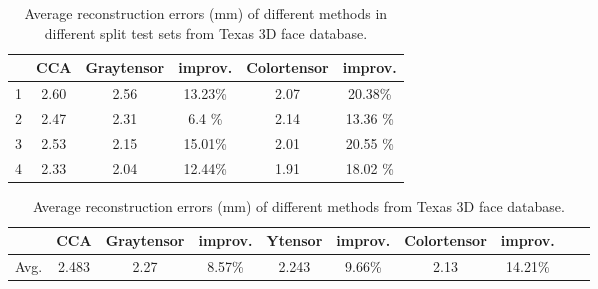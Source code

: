 \begin{table}[htbp]
\centering
\vfill 
\caption{Average reconstruction errors (mm) of different methods in different split test sets from Texas 3D face database.}
\label{table:Re4}%
\begin{tabular}[b]{|l||c|c|c|c|c|}
\hline
 &  CCA & Graytensor & improv. & Colortensor & improv.\\
\hline
\hline
 1  & 2.60 & 2.56 & 13.23\% & 2.07 & 20.38\%  \\   
\hline
 2   & 2.47 & 2.31 &6.4 \% & 2.14 & 13.36 \%  \\
\hline
 3   & 2.53 & 2.15 & 15.01\% & 2.01 & 20.55 \% \\
\hline
 4  & 2.33 & 2.04 & 12.44\% & 1.91 & 18.02 \%   \\
\hline
\end{tabular}%
\end{table}%

\begin{table}[htbp]
\centering
\vfill 
\caption{Average reconstruction errors (mm) of different methods from Texas 3D face database.}
\label{table:Re4_2}%
\begin{tabular}[b]{|l||c|c|c|c|c|c|c|c|c|}

\hline
     & CCA & Graytensor & improv.& Ytensor & improv. &Colortensor & improv. \\
\hline
\hline
Avg. & 2.483 & 2.27 & 8.57\% & 2.243 & 9.66\% & 2.13 & 14.21\%  \\
\hline

\end{tabular}
\end{table}%